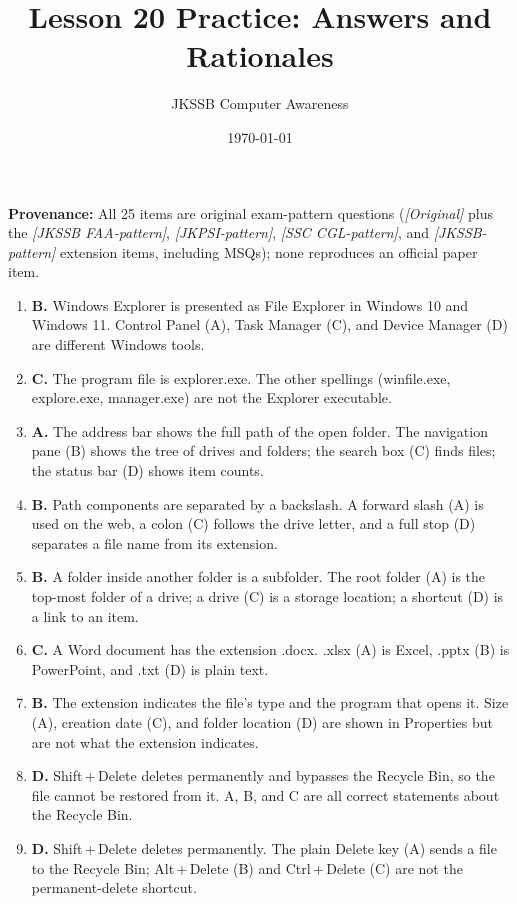 \documentclass[11pt]{article}
\title{Lesson 20 Practice: Answers and Rationales}
\author{JKSSB Computer Awareness}
\date{\today}
\begin{document}
\maketitle
\noindent\textbf{Provenance:} All 25 items are original exam-pattern questions (\textit{[Original]} plus the \textit{[JKSSB FAA-pattern]}, \textit{[JKPSI-pattern]}, \textit{[SSC CGL-pattern]}, and \textit{[JKSSB-pattern]} extension items, including MSQs); none reproduces an official paper item.
\begin{enumerate}[label=\textbf{Q\arabic*.}, leftmargin=*]
\item \textbf{B.} Windows Explorer is presented as File Explorer in Windows 10
  and Windows 11. Control Panel (A), Task Manager (C), and Device Manager (D)
  are different Windows tools.
\item \textbf{C.} The program file is explorer.exe. The other spellings
  (winfile.exe, explore.exe, manager.exe) are not the Explorer executable.
\item \textbf{A.} The address bar shows the full path of the open folder. The
  navigation pane (B) shows the tree of drives and folders; the search box (C)
  finds files; the status bar (D) shows item counts.
\item \textbf{B.} Path components are separated by a backslash. A forward
  slash (A) is used on the web, a colon (C) follows the drive letter, and a
  full stop (D) separates a file name from its extension.
\item \textbf{B.} A folder inside another folder is a subfolder. The root
  folder (A) is the top-most folder of a drive; a drive (C) is a storage
  location; a shortcut (D) is a link to an item.
\item \textbf{C.} A Word document has the extension .docx. .xlsx (A) is Excel,
  .pptx (B) is PowerPoint, and .txt (D) is plain text.
\item \textbf{B.} The extension indicates the file's type and the program that
  opens it. Size (A), creation date (C), and folder location (D) are shown in
  Properties but are not what the extension indicates.
\item \textbf{D.} Shift\,+\,Delete deletes permanently and bypasses the
  Recycle Bin, so the file cannot be restored from it. A, B, and C are all
  correct statements about the Recycle Bin.
\item \textbf{D.} Shift\,+\,Delete deletes permanently. The plain Delete key
  (A) sends a file to the Recycle Bin; Alt\,+\,Delete (B) and Ctrl\,+\,Delete
  (C) are not the permanent-delete shortcut.

\end{enumerate}
\end{document}
